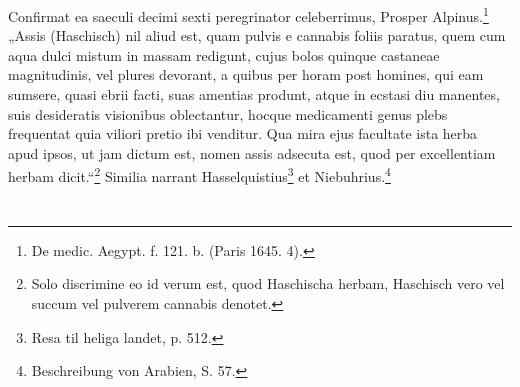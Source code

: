 \documentclass[a4paper, 11pt, oneside, polutonikogreek, english]{article}
\begin{document}
Confirmat ea saeculi decimi sexti peregrinator celeberrimus, Prosper Alpinus.\footnote{De medic. Aegypt. f. 121. b. (Paris 1645. 4).} „Assis (Haschisch) nil aliud est, quam pulvis e cannabis foliis paratus, quem cum aqua dulci mistum in massam redigunt, cujus bolos quinque castaneae magnitudinis, vel plures devorant, a quibus per horam post homines, qui eam sumsere, quasi ebrii facti, suas amentias produnt, atque in ecstasi diu manentes, suis desideratis visionibus oblectantur, hocque medicamenti genus plebs frequentat quia viliori pretio ibi venditur. Qua mira ejus facultate ista herba apud ipsos, ut jam dictum est, nomen assis adsecuta est, quod per excellentiam herbam dicit.“\footnote{Solo discrimine eo id verum est, quod Haschischa herbam, Haschisch vero vel succum vel pulverem cannabis denotet.} Similia narrant Hasselquistius\footnote{Resa til heliga landet, p. 512.} et Niebuhrius.\footnote{Beschreibung von Arabien, S. 57.}
\section{}
\end{document}
